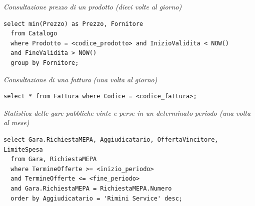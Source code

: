 \noindent{}
\newline\newline

\noindent\textit{Consultazione prezzo di un prodotto (dieci volte al giorno)}
\begin{verbatim}
select min(Prezzo) as Prezzo, Fornitore
  from Catalogo
  where Prodotto = <codice_prodotto> and InizioValidita < NOW()
  and FineValidita > NOW()
  group by Fornitore;
\end{verbatim}
\vspace{0.5cm}

\noindent{}
\newline\newline

\noindent\textit{Consultazione di una fattura (una volta al giorno)}
\begin{verbatim}
select * from Fattura where Codice = <codice_fattura>;
\end{verbatim}
\vspace{1cm}

\noindent\textit{Statistica delle gare pubbliche vinte e perse in un determinato periodo (una volta al mese)}
\begin{verbatim}
select Gara.RichiestaMEPA, Aggiudicatario, OffertaVincitore, LimiteSpesa
  from Gara, RichiestaMEPA
  where TermineOfferte >= <inizio_periodo>
  and TermineOfferte <= <fine_periodo>
  and Gara.RichiestaMEPA = RichiestaMEPA.Numero
  order by Aggiudicatario = 'Rimini Service' desc;
\end{verbatim}
\vspace{0.5cm}

\noindent{}
\newline\newline

